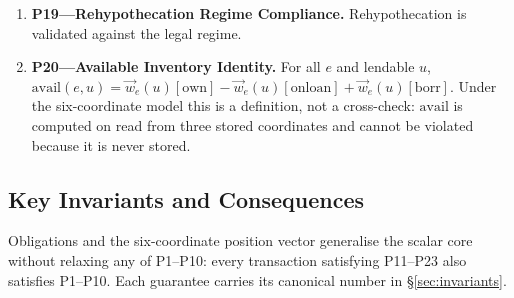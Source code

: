 \begin{invariant}[P11--P20]
\begin{enumerate}
\item \textbf{P19---Rehypothecation Regime Compliance.} Rehypothecation is validated against the legal regime.
\item \textbf{P20---Available Inventory Identity.} For all $e$ and lendable $u$, $\mathrm{avail}(e,u) = \vec{w}_e(u)[\mathrm{own}] - \vec{w}_e(u)[\mathrm{onloan}] + \vec{w}_e(u)[\mathrm{borr}]$. Under the six-coordinate model this is a definition, not a cross-check: $\mathrm{avail}$ is computed on read from three stored coordinates and cannot be violated because it is never stored.
\end{enumerate}
\end{invariant}

\clearpage

\subsection*{Key Invariants and Consequences}

Obligations and the six-coordinate position vector generalise the scalar core without
relaxing any of P1--P10: every transaction satisfying P11--P23 also satisfies P1--P10. Each
guarantee carries its canonical number in \S\ref{sec:invariants}.

